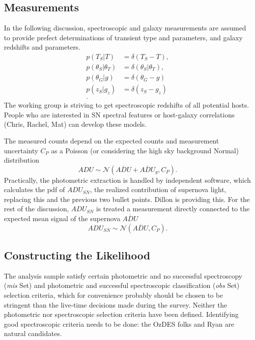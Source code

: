 \documentclass[preprint,3p]{elsarticle}
\begin{document}
\subsection{Measurements}
\label{measurements:sec}
In the following discussion,
spectroscopic and galaxy measurements are assumed
to provide prefect determinations of transient type and parameters, and
galaxy redshifts and parameters. 
\begin{align}
p(T_S|T) &= \delta(T_S-T),\\
p(\theta_S|\theta_T) &= \delta(\theta_S|\theta_T),\\
p(\theta_G|g) &= \delta(\theta_G-g)\\
p(z_S|g_z) &= \delta(z_S-g_z)\\.
\label{specz:eqn}
\end{align}
The working group is striving to get spectroscopic
redshifts of all potential hosts.  People who are interested in SN spectral features
or host-galaxy correlations (Chris, Rachel, Mat) can develop these models.

The measured counts depend on the expected counts and measurement uncertainty
$C_P$ as a Poisson (or considering the high sky background Normal) distribution
\begin{equation}
\mathit{ADU} \sim \mathcal{N} (\overline{\mathit{ADU}}+\overline{\mathit{ADU}}_g ,C_P).
\label{ADU:eqn}
\end{equation}
Practically, the photometric extraction is handled by independent software, which calculates
the pdf of $\mathit{ADU}_{\mathit{SN}}$, the realized contribution of supernova light,
replacing this and the previous two bullet points.  Dillon is providing this.
For the rest of the discussion, $\mathit{ADU}_{\mathit{SN}}$ is treated a measurement
directly connected to the expected mean signal of the supernova
$\overline{\mathit{ADU}}$
\begin{equation}
\mathit{ADU}_{SN} \sim \mathcal{N} (\overline{\mathit{ADU}} ,C_P).
\end{equation}

\subsection{Constructing the Likelihood}

The analysis sample satisfy certain photometric and no successful spectroscopy
({\it mis} Set)  and photometric
and successful spectroscopic classification ({\it obs} Set) selection criteria, which for convenience
probably should  be chosen to be stringent than the live-time decisions made during the survey.
Neither the photometric nor spectroscopic selection criteria have been defined.
Identifying good spectroscopic criteria needs to be done: the OzDES folks and Ryan are natural
candidates.
\end{document}
